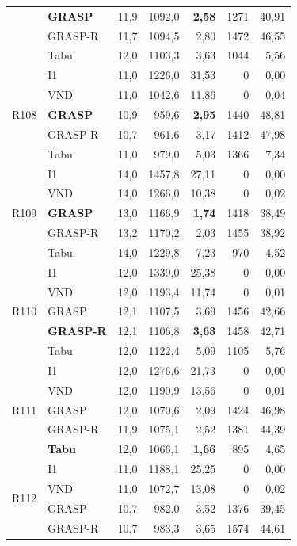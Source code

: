 {\begin{longtable}{llrrrrr}
  & \textbf{GRASP} & 11,9 & 1092,0 & \textbf{2,58} & 1271 & 40,91 \\
  & GRASP-R & 11,7 & 1094,5 & 2,80 & 1472 & 46,55 \\
  & Tabu & 12,0 & 1103,3 & 3,63 & 1044 & 5,56 \\
\midrule
\multirow{5}{*}{R108}
  & I1 & 11,0 & 1226,0 & 31,53 & 0 & 0,00 \\
  & VND & 11,0 & 1042,6 & 11,86 & 0 & 0,04 \\
  & \textbf{GRASP} & 10,9 & 959,6 & \textbf{2,95} & 1440 & 48,81 \\
  & GRASP-R & 10,7 & 961,6 & 3,17 & 1412 & 47,98 \\
  & Tabu & 11,0 & 979,0 & 5,03 & 1366 & 7,34 \\
\midrule
\multirow{5}{*}{R109}
  & I1 & 14,0 & 1457,8 & 27,11 & 0 & 0,00 \\
  & VND & 14,0 & 1266,0 & 10,38 & 0 & 0,02 \\
  & \textbf{GRASP} & 13,0 & 1166,9 & \textbf{1,74} & 1418 & 38,49 \\
  & GRASP-R & 13,2 & 1170,2 & 2,03 & 1455 & 38,92 \\
  & Tabu & 14,0 & 1229,8 & 7,23 & 970 & 4,52 \\
\midrule
\multirow{5}{*}{R110}
  & I1 & 12,0 & 1339,0 & 25,38 & 0 & 0,00 \\
  & VND & 12,0 & 1193,4 & 11,74 & 0 & 0,01 \\
  & GRASP & 12,1 & 1107,5 & 3,69 & 1456 & 42,66 \\
  & \textbf{GRASP-R} & 12,1 & 1106,8 & \textbf{3,63} & 1458 & 42,71 \\
  & Tabu & 12,0 & 1122,4 & 5,09 & 1105 & 5,76 \\
\midrule
\multirow{5}{*}{R111}
  & I1 & 12,0 & 1276,6 & 21,73 & 0 & 0,00 \\
  & VND & 12,0 & 1190,9 & 13,56 & 0 & 0,01 \\
  & GRASP & 12,0 & 1070,6 & 2,09 & 1424 & 46,98 \\
  & GRASP-R & 11,9 & 1075,1 & 2,52 & 1381 & 44,39 \\
  & \textbf{Tabu} & 12,0 & 1066,1 & \textbf{1,66} & 895 & 4,65 \\
\midrule
\multirow{5}{*}{R112}
  & I1 & 11,0 & 1188,1 & 25,25 & 0 & 0,00 \\
  & VND & 11,0 & 1072,7 & 13,08 & 0 & 0,02 \\
  & GRASP & 10,7 & 982,0 & 3,52 & 1376 & 39,45 \\
  & GRASP-R & 10,7 & 983,3 & 3,65 & 1574 & 44,61 \\

\end{longtable}}
